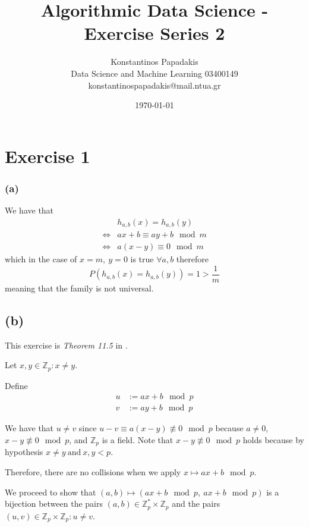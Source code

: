 \documentclass{article}
\title{Algorithmic Data Science - Exercise Series 2}
\author{
    Konstantinos Papadakis\\
    Data Science and Machine Learning 03400149\\
    konstantinospapadakis@mail.ntua.gr
}
\date{\today}
\begin{document}
\maketitle
\newpage

\section*{Exercise 1}

\subsubsection*{(a)}
We have that 
\begin{align*}
    &h_{a,b}(x) = h_{a,b}(y)\\
    \iff& ax + b \equiv ay + b \mod{m}\\
    \iff& a(x-y) \equiv 0 \mod{m}
\end{align*}
which in the case of \(x=m, \  y = 0\) is true \(\forall a, b\)
therefore
\[P(h_{a,b}(x) = h_{a,b}(y)) = 1 > \frac{1}{m}\]
meaning that the family is not universal.

\subsection*{(b)}

This exercise is \emph{Theorem 11.5} in \cite{clrs}.

Let \(x, y \in \mathbb{Z}_p: x \neq y\).

Define
\begin{align*}
    u &:= ax + b \mod{p}\\
    v &:= ay + b \mod{p}
\end{align*}

We have that \(u \neq v\)
since \(u - v \equiv a (x - y) \not\equiv 0 \mod{p}\)
because \(a \neq 0\), \(x - y\not\equiv 0 \mod{p}\),
and \(\mathbb{Z}_p\) is a field.
Note that \(x - y\not\equiv 0 \mod{p}\) holds
because by hypothesis \(x \neq y \ \textrm{and}\ x,y < p\).

Therefore, there are no collisions when we apply \(x \mapsto ax + b \mod{p}\).

We proceed to show that
\((a, b) \mapsto (ax + b \mod{p},\ ax + b \mod{p})\) is a bijection between
the pairs \((a, b) \in \mathbb{Z}_p^* \times \mathbb{Z}_p\)
and the pairs \((u, v) \in \mathbb{Z}_p \times \mathbb{Z}_p: u \neq v\).
\end{document}
